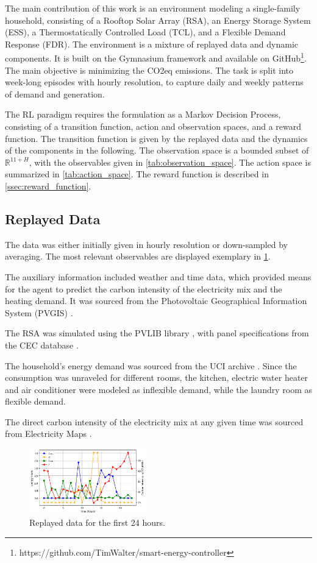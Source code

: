 The main contribution of this work is an environment modeling a single-family household, consisting of a Rooftop Solar Array (RSA), an Energy Storage System (ESS), a Thermostatically Controlled Load (TCL), and a Flexible Demand Response (FDR). The environment is a mixture of replayed data and dynamic components. It is built on the Gymnasium framework \cite{Towers.2023} and available on GitHub\footnote{https://github.com/TimWalter/smart-energy-controller}. The main objective is minimizing the CO2eq emissions. The task is split into week-long episodes with hourly resolution, to capture daily and weekly patterns of demand and generation.
\par
The RL paradigm requires the formulation as a Markov Decision Process, consisting of a transition function, action and observation spaces, and a reward function. The transition function is given by the replayed data and the dynamics of the components in the following. The observation space is a bounded subset of $\mathbb{R}^{11+H}$, with the observables given in \cref{tab:observation_space}. The action space is summarized in  \cref{tab:action_space}. The reward function is described in \cref{ssec:reward_function}.

\subsection{Replayed Data}\label{ssec:static_components}
The data was either initially given in hourly resolution or down-sampled by averaging. The most relevant observables are displayed exemplary in \cref{fig:static_components}.
\par
The auxiliary information included weather and time data, which provided means for the agent to predict the carbon intensity of the electricity mix and the heating demand. It was sourced from the Photovoltaic Geographical Information System (PVGIS) \cite{ThomasHuld.2012}.
\par
The RSA was simulated using the PVLIB library \cite{F.Holmgren.2018}, with panel specifications from the CEC database \cite{Dobos.2012}\cite{Boyson.2007}.
\par
The household's energy demand was sourced from the UCI archive \cite{GeorgesHebrail.2006}. Since the consumption was unraveled for different rooms, the kitchen, electric water heater and air conditioner were modeled as inflexible demand, while the laundry room as flexible demand.
\par
The direct carbon intensity of the electricity mix at any given time was sourced from Electricity Maps \cite{ElectricityMaps.2023}. 
\begin{figure}[H]
    \centering
    \setlength{\abovecaptionskip}{0pt}
    \includegraphics[width=0.45\textwidth]{figures/static_components.png}
    \caption{Replayed data for the first 24 hours.}
    \label{fig:static_components}
\end{figure}

